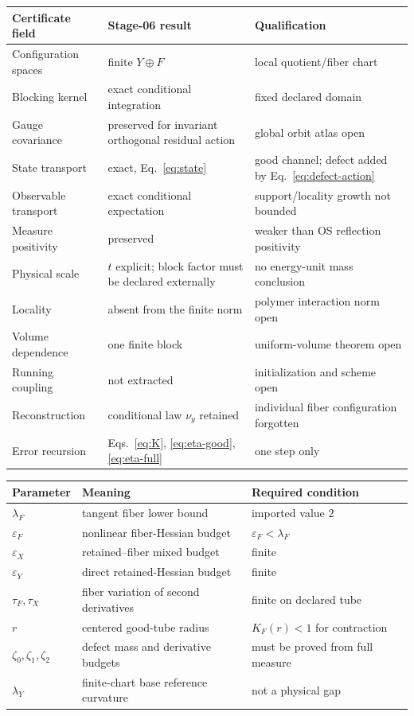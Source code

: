 \documentclass[11pt]{article}
\theoremstyle{definition}
\begin{document}
\begin{longtable}{@{}p{}p{}p{}@{}}
\toprule
Certificate field & Stage-06 result & Qualification\\
\midrule
\endhead
Configuration spaces & finite $Y\oplus F$ & local quotient/fiber chart\\
Blocking kernel & exact conditional integration & fixed declared domain\\
Gauge covariance & preserved for invariant orthogonal residual action & global orbit atlas open\\
State transport & exact, Eq.~\eqref{eq:state} & good channel; defect added by Eq.~\eqref{eq:defect-action}\\
Observable transport & exact conditional expectation & support/locality growth not bounded\\
Measure positivity & preserved & weaker than OS reflection positivity\\
Physical scale & $t$ explicit; block factor must be declared externally & no energy-unit mass conclusion\\
Locality & absent from the finite norm & polymer interaction norm open\\
Volume dependence & one finite block & uniform-volume theorem open\\
Running coupling & not extracted & initialization and scheme open\\
Reconstruction & conditional law $\nu_y$ retained & individual fiber configuration forgotten\\
Error recursion & Eqs.~\eqref{eq:K}, \eqref{eq:eta-good}, \eqref{eq:eta-full} & one step only\\
\bottomrule
\end{longtable}

\begin{center}
\begin{tabular}{@{}lll@{}}
\toprule
Parameter & Meaning & Required condition\\
\midrule
$\lambda_F$ & tangent fiber lower bound & imported value $2$\\
$\varepsilon_F$ & nonlinear fiber-Hessian budget & $\varepsilon_F<\lambda_F$\\
$\varepsilon_X$ & retained--fiber mixed budget & finite\\
$\varepsilon_Y$ & direct retained-Hessian budget & finite\\
$\tau_F,\tau_X$ & fiber variation of second derivatives & finite on declared tube\\
$r$ & centered good-tube radius & $K_F(r)<1$ for contraction\\
$\zeta_0,\zeta_1,\zeta_2$ & defect mass and derivative budgets & must be proved from full measure\\
$\lambda_Y$ & finite-chart base reference curvature & not a physical gap\\
\bottomrule
\end{tabular}
\end{center}
\end{document}
